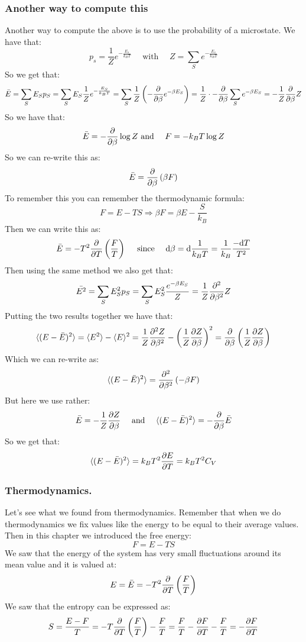 \documentclass[10pt,a4paper]{book}
\begin{document}
\subsubsection{Another way to compute this}
Another way to compute the above is to use the probability of a microstate. We have that:
\[
p_s = \frac{1}{Z} e^{-\frac{E_s}{k_B T}} \quad \text{ with } \quad Z = \sum_S e^{- \frac{E_s}{k_B T}}
\]
So we get that:
\[
\bar{E} = \sum_S E_S p_S = \sum_S E_S \frac{1}{Z} e^{-\frac{E_S}{k_B T}} = \sum_S \frac{1}{Z}\left( - \pdv{}{\beta} e^{-\beta E_S}\right) = \frac{1}{Z} \cdot -\pdv{}{\beta} \sum_S e^{-\beta E_S } = -\frac{1}{Z}\pdv{}{\beta}Z
\]
So we have that:
\[\bar{E} = - \pdv{}{\beta} \log Z \text{ and } \quad F = - k_B T \log Z\]
So we can re-write this as:
\[
\bar{E} = \pdv{}{\beta} \left(\beta F\right)
\]
To remember this you can remember the thermodynamic formula:
\[
F = E -TS \Rightarrow \beta F = \beta E - \frac{S}{k_B}
\]
Then we can write this as:
\[
\bar{E} = - T^2 \pdv{}{T} \left(\frac{F}{T}\right) \quad \text{ since } \quad \dd \beta = \dd \frac{1}{k_B T} = \frac{1}{k_B} \frac{-\dd T}{T^2}
\]
Then using the same method we also get that:
\[
\bar{E^2} = \sum_S E_S^2 p_S = \sum_S E_S^2 \frac{e^{-\beta E_S}}{Z} = \frac{1}{Z} \pdv[2]{}{\beta} Z
\]
Putting the two results together we have that:
\[
\langle (E- \bar{E})^2 \rangle = \langle E^2 \rangle - \langle E \rangle^2 = \frac{1}{Z}\pdv[2]{Z}{\beta} - \left(\frac{1}{Z}\pdv{Z}{\beta}\right)^2 = \pdv{}{\beta}\left(\frac{1}{Z}\pdv{Z}{\beta}\right)
\]
Which we can re-write as:
\[
\langle (E - \bar{E})^2 \rangle = \pdv[2]{}{\beta} \left( -\beta F\right)
\]
But here we use rather:
\[
\bar{E} = - \frac{1}{Z}\pdv{Z}{\beta} \quad \text{ and } \quad \langle (E - \bar{E})^2\rangle = - \pdv{}{\beta} \bar{E}
\]
So we get that:
\[
\langle (E - \bar{E})^2 \rangle = k_B T^2 \pdv{E}{T} = k_B T^2 C_V
\]
\subsubsection{Thermodynamics.}
Let's see what we found from thermodynamics. Remember that when we do thermodynamics we fix values like the energy to be equal to their average values. Then in this chapter we introduced the free energy:
\[
F = E - TS
\]
We saw that the energy of the system has very small fluctuations around its mean value and it is valued at:
\[
E = \bar{E} = - T^2 \pdv{}{T}\left(\frac{F}{T}\right)
\]
We saw that the entropy can be expressed as:
\[
S = \frac{E - F}{T} = - T \pdv{}{T} \left(\frac{F}{T}\right) - \frac{F}{T} = \frac{F}{T} - \pdv{F}{T} - \frac{F}{T} = - \pdv{F}{T}
\]
\end{document}
